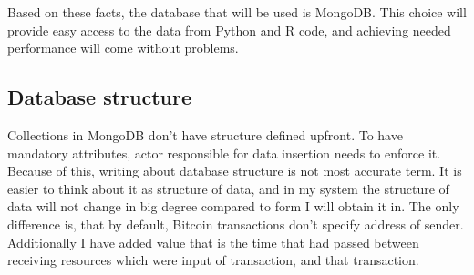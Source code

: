\documentclass[12pt, en, eng, oneside]{mgr}
\begin{document}
Based on these facts, the database that will be used is MongoDB. This choice will provide easy access to the data from Python and R code, and achieving needed performance will come without problems.


\subsection{Database structure}
 
Collections in MongoDB don't have structure defined upfront. To have mandatory attributes, actor responsible for data insertion needs to enforce it. Because of this, writing about database structure is not most accurate term. It is easier to think about it as structure of data, and in my system the structure of data will not change in big degree compared to form I will obtain it in. The only difference is, that by default, Bitcoin transactions don't specify address of sender. Additionally I have added value that is the time that had passed between receiving resources which were input of transaction, and that transaction.
\end{document}
